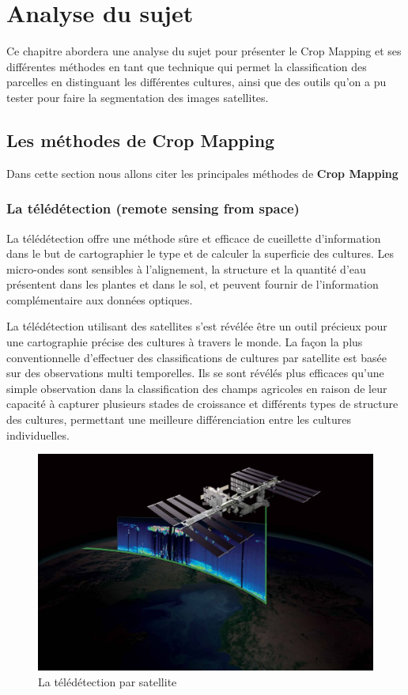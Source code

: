 \documentclass[12pt, openany]{report}
\begin{document}
\chapter{Analyse du sujet}


Ce chapitre abordera une analyse du sujet pour présenter le Crop Mapping et ses différentes méthodes en tant que technique qui permet la classification des parcelles en distinguant les différentes cultures, ainsi que des outils qu’on a pu tester pour faire la segmentation des images satellites. 

\newpage
\section{Les méthodes de Crop Mapping}

Dans cette section nous allons citer les principales méthodes de \textbf{Crop Mapping}

\subsection{La télédétection (remote sensing from space)}

La télédétection offre une méthode sûre et efficace de cueillette d'information dans le but de cartographier le type et de calculer la superficie des cultures.
Les micro-ondes sont sensibles à l'alignement, la structure et la quantité d'eau présentent dans les plantes et dans le sol, et peuvent fournir de l'information complémentaire aux données optiques. 

\par
La télédétection utilisant des satellites s'est révélée être un outil précieux pour une cartographie précise des cultures à travers le monde. La façon la plus conventionnelle d'effectuer des classifications de cultures par satellite est basée sur des observations multi temporelles. Ils se sont révélés plus efficaces qu'une simple observation dans la classification des champs agricoles en raison de leur capacité à capturer plusieurs stades de croissance et différents types de structure des cultures, permettant une meilleure différenciation entre les cultures individuelles. \cite{cropmapp}

\begin{figure}[H]
\centering
\includegraphics[scale=0.15]{tele.jpg}
\caption{La télédétection par satellite}
\end{figure}
\end{document}
